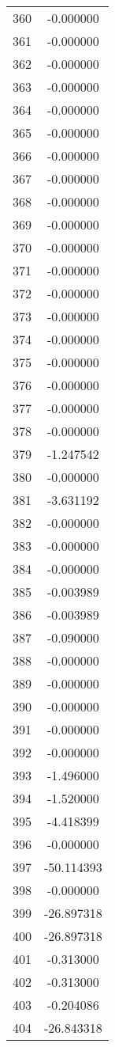 \documentclass[12pt]{article}
\begin{document}
\begin{longtable}{@{}cc@{}}
360 & -0.000000 \\
361 & -0.000000 \\
362 & -0.000000 \\
363 & -0.000000 \\
364 & -0.000000 \\
365 & -0.000000 \\
366 & -0.000000 \\
367 & -0.000000 \\
368 & -0.000000 \\
369 & -0.000000 \\
370 & -0.000000 \\
371 & -0.000000 \\
372 & -0.000000 \\
373 & -0.000000 \\
374 & -0.000000 \\
375 & -0.000000 \\
376 & -0.000000 \\
377 & -0.000000 \\
378 & -0.000000 \\
379 & -1.247542 \\
380 & -0.000000 \\
381 & -3.631192 \\
382 & -0.000000 \\
383 & -0.000000 \\
384 & -0.000000 \\
385 & -0.003989 \\
386 & -0.003989 \\
387 & -0.090000 \\
388 & -0.000000 \\
389 & -0.000000 \\
390 & -0.000000 \\
391 & -0.000000 \\
392 & -0.000000 \\
393 & -1.496000 \\
394 & -1.520000 \\
395 & -4.418399 \\
396 & -0.000000 \\
397 & -50.114393 \\
398 & -0.000000 \\
399 & -26.897318 \\
400 & -26.897318 \\
401 & -0.313000 \\
402 & -0.313000 \\
403 & -0.204086 \\
404 & -26.843318 \\

\end{longtable}
\end{document}
